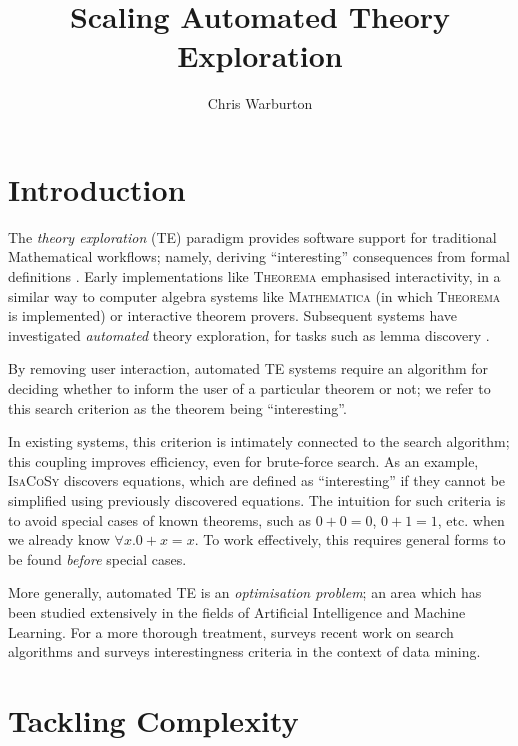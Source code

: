 \documentclass{eceasst}
\title{Scaling Automated Theory Exploration} %
\author{Chris Warburton\sponsor{}} %
\institute{ %
\email{cmwarburton@dundee.ac.uk}, \url{http://www.computing.dundee.ac.uk/about/staff/124}\\
School of Computing\\
University of Dundee}
\begin{document}
\maketitle

\section{Introduction}

The \emph{theory exploration} (TE) paradigm provides software support
for traditional Mathematical workflows; namely, deriving ``interesting''
consequences from formal definitions \cite{RISC1482}. Early
implementations like \textsc{Theorema} \cite{buchberger2000theory} emphasised
interactivity, in a similar way to computer algebra systems like
\textsc{Mathematica} (in which \textsc{Theorema} is implemented) or
interactive theorem provers. Subsequent systems have investigated
\emph{automated} theory exploration, for tasks such as lemma discovery
\cite{Hipster}.

By removing user interaction, automated TE systems require an algorithm
for deciding whether to inform the user of a particular theorem or not; we refer
to this search criterion as the theorem being ``interesting''.

In existing systems, this criterion is intimately connected to the
search algorithm; this coupling improves efficiency, even for brute-force
search. As an example, \textsc{IsaCoSy} \cite{johansson2009isacosy} discovers
equations, which are defined as ``interesting'' if they cannot be simplified
using previously discovered equations. The intuition for such criteria is to
avoid special cases of known theorems, such as \(0 + 0 = 0\), \(0 + 1 = 1\),
etc. when we already know \(\forall x. 0 + x = x\). To work effectively, this
requires general forms to be found \emph{before} special cases.

More generally, automated TE is an \emph{optimisation problem}; an area which
has been studied extensively in the fields of Artificial Intelligence and
Machine Learning. For a more thorough treatment, \cite{geng2006interestingness}
surveys recent work on search algorithms and \cite{blum2011hybrid} surveys
interestingness criteria in the context of data mining.

\section{Tackling Complexity}
\end{document}
